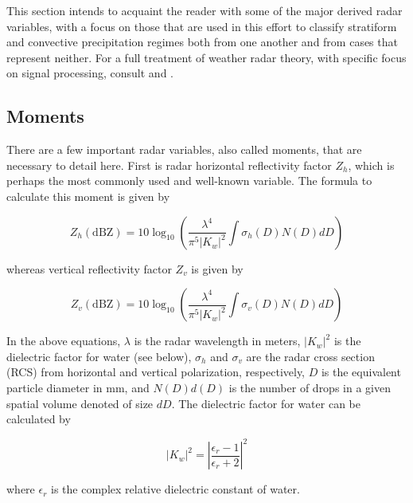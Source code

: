 This section intends to acquaint the reader with some of the major derived radar variables, with a focus on those that are used in this effort to classify stratiform and convective precipitation regimes both from one another and from cases that represent neither.
For a full treatment of weather radar theory, with specific focus on signal processing, consult \cite{bringi2001polarimetric} and \cite{doviak2006doppler}.


\subsection{Moments}
\label{ssec:background_moments}
% 

There are a few important radar variables, also called moments, that are necessary to detail here.
First is radar horizontal reflectivity factor $Z_h$, which is perhaps the most commonly used and well-known variable.
The formula to calculate this moment is given by \cite{bringi2001polarimetric}

\begin{equation}
Z_h (\mathrm{dBZ}) = 10\log_{10}\left( \frac{\lambda^4}{\pi^5 \left|K_w\right|^2}\int \sigma_h(D)N(D)dD \right)
\end{equation}

whereas vertical reflectivity factor $Z_v$ is given by

\begin{equation}
Z_v (\mathrm{dBZ})= 10\log_{10}\left( \frac{\lambda^4}{\pi^5 \left|K_w\right|^2}\int \sigma_v(D)N(D)dD \right)
\end{equation}

In the above equations, $\lambda$ is the radar wavelength in meters, $\left|K_w\right|^2$ is the dielectric factor for water (see below), $\sigma_h$ and $\sigma_v$ are the radar cross section (RCS) from horizontal and vertical polarization, respectively, $D$ is the equivalent particle diameter in mm, and $N(D)d(D)$ is the number of drops in a given spatial volume denoted of size $dD$.
The dielectric factor for water can be calculated by

\begin{equation}
\left|K_w\right|^2 = \left|\frac{\epsilon_r - 1}{\epsilon_r + 2}\right|^2
\end{equation}

where $\epsilon_r$ is the complex relative dielectric constant of water.

